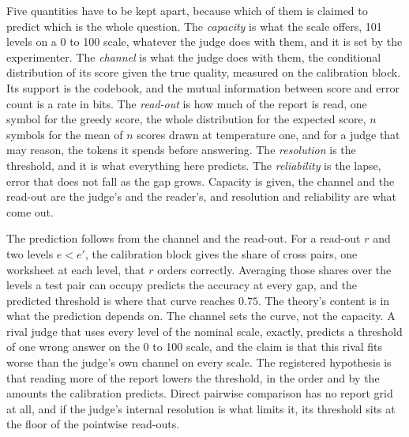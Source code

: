 \documentclass{article}
\theoremstyle{definition}
\theoremstyle{remark}
\begin{document}
Five quantities have to be kept apart, because which of them is claimed to predict which is the whole question.
The \emph{capacity} is what the scale offers, 101 levels on a 0 to 100 scale, whatever the judge does with them, and it is set by the experimenter.
The \emph{channel} is what the judge does with them, the conditional distribution of its score given the true quality, measured on the calibration block. Its support is the codebook, and the mutual information between score and error count is a rate in bits.
The \emph{read-out} is how much of the report is read, one symbol for the greedy score, the whole distribution for the expected score, $n$ symbols for the mean of $n$ scores drawn at temperature one, and for a judge that may reason, the tokens it spends before answering.
The \emph{resolution} is the threshold, and it is what everything here predicts.
The \emph{reliability} is the lapse, error that does not fall as the gap grows.
Capacity is given, the channel and the read-out are the judge's and the reader's, and resolution and reliability are what come out.

The prediction follows from the channel and the read-out.
For a read-out $r$ and two levels $e<e'$, the calibration block gives the share of cross pairs, one worksheet at each level, that $r$ orders correctly.
Averaging those shares over the levels a test pair can occupy predicts the accuracy at every gap, and the predicted threshold is where that curve reaches $0.75$.
The theory's content is in what the prediction depends on.
The channel sets the curve, not the capacity.
A rival judge that uses every level of the nominal scale, exactly, predicts a threshold of one wrong answer on the 0 to 100 scale, and the claim is that this rival fits worse than the judge's own channel on every scale.
The registered hypothesis is that reading more of the report lowers the threshold, in the order and by the amounts the calibration predicts.
Direct pairwise comparison has no report grid at all, and if the judge's internal resolution is what limits it, its threshold sits at the floor of the pointwise read-outs.
\end{document}
